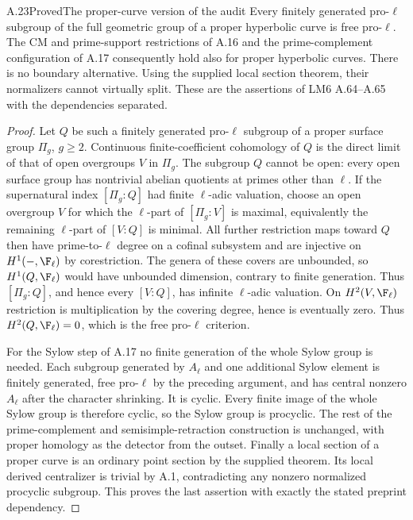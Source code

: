 \begin{statement}{A.23}{Proved}{The proper-curve version of the audit}
Every finitely generated pro-$\ell$ subgroup of the full
geometric group of a proper hyperbolic curve is free pro-$\ell$.
The CM and prime-support restrictions of A.16 and the
prime-complement configuration of A.17 consequently hold
also for proper hyperbolic curves. There is no boundary
alternative. Using the supplied local section theorem, their
normalizers cannot virtually split. These are the assertions
of LM6 A.64--A.65 with the dependencies separated.
\end{statement}
\begin{proof}
Let $Q$ be such a finitely generated pro-$\ell$ subgroup of
a proper surface group $\Pi_g$, $g\ge2$.
Continuous finite-coefficient cohomology of $Q$ is the direct
limit of that of open overgroups $V$ in $\Pi_g$.
The subgroup $Q$ cannot be open: every open surface group has
nontrivial abelian quotients at primes other than $\ell$.
If the supernatural index $[\Pi_g:Q]$ had finite $\ell$-adic
valuation, choose an open overgroup $V$ for which the
$\ell$-part of $[\Pi_g:V]$ is maximal, equivalently the
remaining $\ell$-part of $[V:Q]$ is minimal. All further
restriction maps toward $Q$ then have prime-to-$\ell$ degree
on a cofinal subsystem and are injective on $H^1(-,\F_\ell)$
by corestriction. The genera of these covers are unbounded,
so $H^1(Q,\F_\ell)$ would have unbounded dimension, contrary
to finite generation. Thus $[\Pi_g:Q]$, and hence every
$[V:Q]$, has infinite $\ell$-adic valuation.
On $H^2(V,\F_\ell)$ restriction is
multiplication by the covering degree, hence is eventually
zero. Thus $H^2(Q,\F_\ell)=0$, which is the free pro-$\ell$
criterion.

For the Sylow step of A.17 no finite generation of the whole
Sylow group is needed. Each subgroup generated by $A_\ell$
and one additional Sylow element is finitely generated,
free pro-$\ell$ by the preceding argument, and has central
nonzero $A_\ell$ after the character shrinking. It is cyclic.
Every finite image of the whole Sylow group is therefore
cyclic, so the Sylow group is procyclic. The rest of the
prime-complement and semisimple-retraction construction is
unchanged, with proper homology as the detector from the
outset. Finally a local section of a proper curve is an
ordinary point section by the supplied theorem. Its local
derived centralizer is trivial by A.1, contradicting any
nonzero normalized procyclic subgroup. This proves the last
assertion with exactly the stated preprint dependency.
\end{proof}

